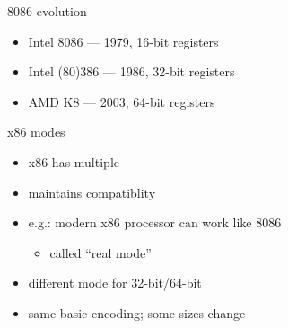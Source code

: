 \begin{frame}{8086 evolution}
\begin{itemize}
\item Intel 8086 --- 1979, 16-bit registers
\item Intel (80)386 --- 1986, 32-bit registers
\item AMD K8 --- 2003, 64-bit registers
\end{itemize}
\end{frame}

\begin{frame}{x86 modes}
\begin{itemize}
\item x86 has multiple 
\item maintains compatiblity
\item e.g.: modern x86 processor can work like 8086
    \begin{itemize}
    \item called ``real mode''
    \end{itemize}
\item different mode for 32-bit/64-bit
\item same basic encoding; some sizes change
\end{itemize}
\end{frame}

